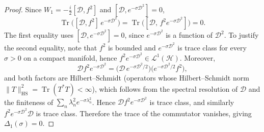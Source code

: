 \documentclass[10pt,a4paper]{amsart}
\newcommand{\Tr}{\operatorname{Tr}}
\newcommand{\cD}{\mathcal{D}}
\newcommand{\cH}{\mathcal{H}}
\begin{document}
\begin{proof}
Since $W_1 = -\tfrac{i}{2}[\cD, f^2]$ and $[\cD, e^{-\sigma\cD^2}] = 0$,
\begin{equation}
  \Tr\bigl([\cD, f^2]\,e^{-\sigma\cD^2}\bigr)
  = \Tr\bigl([\cD,\, f^2 e^{-\sigma\cD^2}]\bigr) = 0.
\end{equation}
The first equality uses $[\cD,e^{-\sigma\cD^2}]=0$, since
$e^{-\sigma\cD^2}$ is a function of $\cD^2$. To justify the second
equality, note that $f^2$ is bounded and $e^{-\sigma\cD^2}$ is trace
class for every $\sigma>0$ on a compact manifold, hence
$f^2e^{-\sigma\cD^2}\in \mathcal{L}^1(\cH)$. Moreover,
\begin{equation}
\cD f^2 e^{-\sigma\cD^2}=
\bigl(\cD\,e^{-\sigma\cD^2/2}\bigr)\!\bigl(e^{-\sigma\cD^2/2}f^2\bigr),
\end{equation}
and both factors are Hilbert--Schmidt (operators whose Hilbert--Schmidt
norm $\|T\|_{\mathrm{HS}}^2=\Tr(T^*T)<\infty$), which follows from the
spectral resolution of $\cD$ and the finiteness of
$\sum_n \lambda_n^2 e^{-\sigma \lambda_n^2}$. Hence
$\cD f^2 e^{-\sigma\cD^2}$ is trace class, and similarly
$f^2e^{-\sigma\cD^2}\cD$ is trace class. Therefore the trace of the
commutator vanishes, giving $\Delta_1(\sigma)=0$.
\end{proof}
\end{document}
